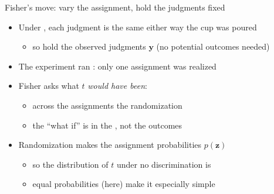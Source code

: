 \documentclass[table, xcolor = {dvipsnames}, 9pt]{beamer}
\theoremstyle{plain}
\newcommand{\mh}[1]{{\color{magenta}{#1}}}
\begin{document}
\begin{frame}{Fisher's move: vary the assignment, hold the judgments fixed}
\vfill
\begin{itemize} \vfill
\item Under \mh{no discrimination}, each judgment is the same either way the cup was poured \vfill
\begin{itemize} \vfill
\item so hold the observed judgments $\bm{y}$ \mh{fixed} (no potential outcomes needed) \vfill
\end{itemize} \vfill
\item The experiment ran \mh{once}: only one assignment was realized \vfill
\item Fisher asks what $t$ \emph{would have been}: \vfill
\begin{itemize} \vfill
\item across the assignments the randomization \mh{could have produced} \vfill
\item the ``what if'' is in the \mh{assignment}, not the outcomes \vfill
\end{itemize} \vfill
\item Randomization makes the assignment probabilities $p(\bm{z})$ \mh{known} \vfill
\begin{itemize} \vfill
\item so the distribution of $t$ under no discrimination is \mh{known} \vfill
\item equal probabilities (here) make it especially simple \vfill
\end{itemize} \vfill
\end{itemize} \vfill
\end{frame}
\end{document}
